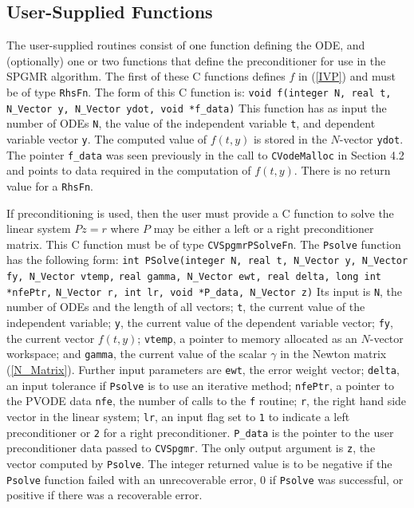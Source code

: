 \subsection{User-Supplied Functions}

The user-supplied routines consist of one function defining the ODE, and
(optionally) one or two functions that define the preconditioner for
use in the SPGMR algorithm. The first of these C functions defines $f$
in (\ref{IVP}) and must be of type {\tt RhsFn}. The form of this C
function is:
\newline \hspace*{.4in} {\tt void f(integer N, real t, N\_Vector y, 
N\_Vector ydot, void *f\_data)} 
\newline This function has as input the number of ODEs {\tt N}, the
value of the independent variable {\tt t}, and dependent variable
vector {\tt y}. The computed value of $f(t, y)$ is stored in the
$N$-vector {\tt ydot}. The pointer {\tt f\_data} was seen previously
in the call to {\tt CVodeMalloc} in Section 4.2 and points to data
required in the computation of $f(t, y)$. There is no return value for
a {\tt RhsFn}.

If preconditioning is used, then the user must provide a C function to
solve the linear system $Pz = r$ where $P$ may be either a left or a
right preconditioner matrix.  This C function must be of type
{\tt CVSpgmrPSolveFn}. The {\tt Psolve} function has the following form:
\newline \hspace*{.4 in} {\tt int PSolve(integer N, real t, N\_Vector y,
N\_Vector fy, N\_Vector vtemp,}
\newline \hspace*{1.0 in} {\tt real gamma, N\_Vector ewt, real delta, 
long int *nfePtr,} 
\newline \hspace*{1.0 in} {\tt N\_Vector r, int lr, void *P\_data,
N\_Vector z)}
\newline Its input is {\tt N}, the number of ODEs and the length of
all vectors; {\tt t}, the current value of the independent variable;
{\tt y}, the current value of the dependent variable vector; {\tt fy},
the current vector $f(t, y)$; {\tt vtemp}, a pointer to memory
allocated as an $N$-vector workspace; and {\tt gamma}, the current
value of the scalar $\gamma$ in the Newton matrix (\ref{N_Matrix}).
Further input parameters are {\tt ewt}, the error weight vector; 
{\tt delta}, an input tolerance if {\tt Psolve} is to use an iterative
method; {\tt nfePtr}, a pointer to the PVODE data {\tt nfe}, the
number of calls to the {\tt f} routine; {\tt r}, the right hand side
vector in the linear system; {\tt lr}, an input flag set to {\tt 1} to
indicate a left preconditioner or {\tt 2} for a right preconditioner. 
{\tt P\_data} is the pointer to the user preconditioner data passed to
{\tt CVSpgmr}.  The only output argument is {\tt z}, the vector
computed by {\tt Psolve}. The integer returned value is to be negative
if the {\tt Psolve} function failed with an unrecoverable error, 0 if
{\tt Psolve} was successful, or positive if there was a recoverable
error.

